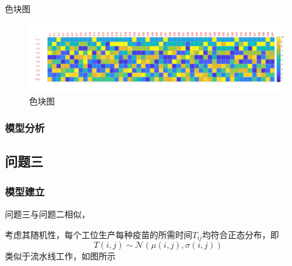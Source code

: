 \documentclass[UTF8]{ctexart}
\begin{document}
\begin{enumerate}
	色块图
		\begin{figure}[H]
			\centering %
			\includegraphics[scale=0.5]{2_sekuai.jpg}
			\caption{色块图}
		\end{figure}
	\end{enumerate}
	
	\subsubsection{模型分析}
	
	\subsection{问题三}
	\subsubsection{模型建立}
	问题三与问题二相似，
	
	考虑其随机性，每个工位生产每种疫苗的所需时间$T_{ij}$均符合正态分布，即
	\begin{equation}
	T(i,j)\sim\mathcal{N}(\mu(i,j),\sigma(i,j))
	\end{equation}
	类似于流水线工作，如图所示
	
\end{document}
